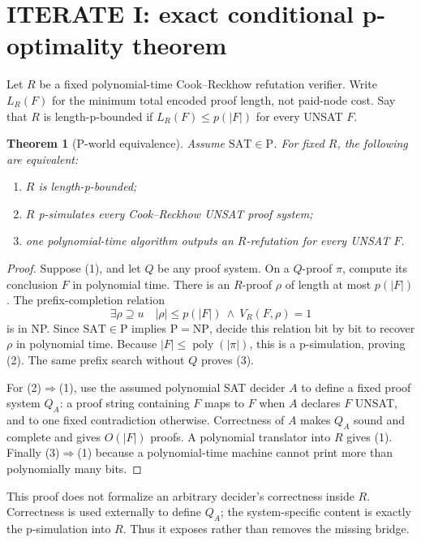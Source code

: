 \documentclass[11pt]{article}
\newtheorem{theorem}{Theorem}
\begin{document}
\section{ITERATE I: exact conditional p-optimality theorem}

Let $R$ be a fixed polynomial-time Cook--Reckhow refutation verifier.  Write $L_R(F)$ for the minimum total encoded proof length, not paid-node cost.  Say that $R$ is length-p-bounded if $L_R(F)\le p(|F|)$ for every UNSAT $F$.

\begin{theorem}[P-world equivalence]\label{thm:pworld}
Assume $\mathrm{SAT}\in\mathrm P$.  For fixed $R$, the following are equivalent:
\begin{enumerate}
\item $R$ is length-p-bounded;
\item $R$ p-simulates every Cook--Reckhow UNSAT proof system;
\item one polynomial-time algorithm outputs an $R$-refutation for every UNSAT $F$.
\end{enumerate}
\end{theorem}
\begin{proof}
Suppose (1), and let $Q$ be any proof system.  On a $Q$-proof $\pi$, compute its conclusion $F$ in polynomial time.  There is an $R$-proof $\rho$ of length at most $p(|F|)$.  The prefix-completion relation
\[
\exists\rho\supseteq u\quad |\rho|\le p(|F|)\ \wedge\ V_R(F,\rho)=1
\]
is in NP.  Since $\mathrm{SAT}\in\mathrm P$ implies $\mathrm P=\mathrm{NP}$, decide this relation bit by bit to recover $\rho$ in polynomial time.  Because $|F|\le\operatorname{poly}(|\pi|)$, this is a p-simulation, proving (2).  The same prefix search without $Q$ proves (3).

For (2)$\Rightarrow$(1), use the assumed polynomial SAT decider $A$ to define a fixed proof system $Q_A$: a proof string containing $F$ maps to $F$ when $A$ declares $F$ UNSAT, and to one fixed contradiction otherwise.  Correctness of $A$ makes $Q_A$ sound and complete and gives $O(|F|)$ proofs.  A polynomial translator into $R$ gives (1).  Finally (3)$\Rightarrow$(1) because a polynomial-time machine cannot print more than polynomially many bits.
\end{proof}

This proof does not formalize an arbitrary decider's correctness inside $R$.  Correctness is used externally to define $Q_A$; the system-specific content is exactly the p-simulation into $R$.  Thus it exposes rather than removes the missing bridge.
\end{document}
